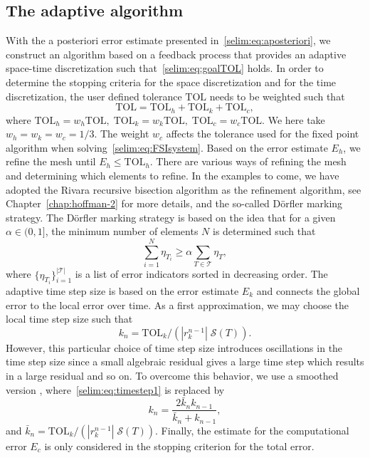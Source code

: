 \subsection{The adaptive algorithm}

With the a posteriori error estimate presented
in~\eqref{selim:eq:aposteriori}, we construct an algorithm based on a
feedback process that provides an adaptive space-time discretization
such that~\eqref{selim:eq:goalTOL} holds.
In order to determine the stopping criteria for the space
discretization and for the time discretization, the user defined
tolerance $\mathrm{TOL}$ needs to be weighted such that
\begin{equation}
\mathrm{TOL} = \mathrm{TOL}_h + \mathrm{TOL}_k + \mathrm{TOL}_c,
\end{equation}
where $\mathrm{TOL}_h = w_h \mathrm{TOL}, \;\mathrm{TOL}_k = w_k
\mathrm{TOL}, \;\mathrm{TOL}_c = w_c \mathrm{TOL}$.  We here take $w_h
= w_k = w_c = 1/3$. The weight $w_c$ affects the tolerance used for
the fixed point algorithm when
solving~\eqref{selim:eq:FSIsystem}. Based on the error estimate $E_h$,
we refine the mesh until $E_h \leq \mathrm{TOL}_h$.  There are various
ways of refining the mesh and determining which elements to refine. In
the examples to come, we have adopted the Rivara recursive bisection
algorithm as the refinement algorithm, see
Chapter~\ref{chap:hoffman-2} for more details, and the so-called
D\"{o}rfler \citep{Dorfler1996} marking strategy. The D\"{o}rfler
marking strategy is based on the idea that for a given
$\alpha\in(0,1]$, the minimum number of elements $N$ is determined
  such that
\begin{equation}
  \label{selim:eq:dorfler}
\sum_{i=1}^{N}\eta_{T_i} \geq  \alpha \sum_{T\in\mathcal{T}}\eta_T ,
\end{equation}
where $\{ \eta_{T_{i}}\}_{i = 1}^{|\mathcal{T}|}$ is a list of error
indicators sorted in decreasing order.  The adaptive time step size is
based on the error estimate $E_k$ and connects the global error to the
local error over time. As a first approximation, we may choose the
local time step size such that
\begin{equation}
\label{selim:eq:timestep1}
k_n = \mathrm{TOL}_k /(| r_k^{n-1} |\; \mathcal{S}(T)).
\end{equation}
However, this particular choice of time step size introduces
oscillations in the time step size since a small algebraic residual
gives a large time step which results in a large residual and so
on. To overcome this behavior, we use a smoothed
version \citep{Logg2003d}, where~\eqref{selim:eq:timestep1} is replaced
by
\begin{equation}
\label{selim:eq:timestep2}
k_n = \frac{2\bar{k}_n k_{n-1}}{\bar{k}_n + k_{n-1}},
\end{equation}
and $\bar{k}_n = \mathrm{TOL}_k/(| r_k^{n-1} |
\;\mathcal{S}(T))$. Finally, the estimate for the computational error
$E_c$ is only considered in the stopping criterion for the total
error.

